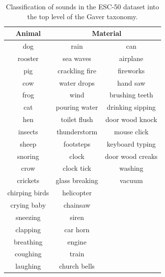 \begin{table}[]
    \begin{tabular}{c|cc}
    \textbf{Animal} & \multicolumn{2}{c}{\textbf{Material}}  \\ \hline
    dog             & rain              & can                \\
    rooster         & sea waves         & airplane           \\
    pig             & crackling fire    & fireworks          \\
    cow             & water drops       & hand saw           \\
    frog            & wind              & brushing teeth     \\
    cat             & pouring water     & drinking sipping   \\
    hen             & toilet flush      & door wood knock    \\
    insects         & thunderstorm      & mouse click        \\
    sheep           & footsteps         & keyboard typing    \\
    snoring         & clock             & door wood creaks   \\
    crow            & clock tick        & washing            \\
    crickets        & glass breaking    & vacuum             \\
    chirping birds  & helicopter        &                    \\
    crying baby     & chainsaw          &                    \\
    sneezing        & siren             &                    \\
    clapping        & car horn          &                    \\
    breathing       & engine            &                    \\
    coughing        & train             &                    \\
    laughing        & church bells      &                   
    \end{tabular}
    \caption{Classification of sounds in the ESC-50 dataset into the top level of the Gaver taxonomy.}
    \label{tab:relabel}
\end{table}

